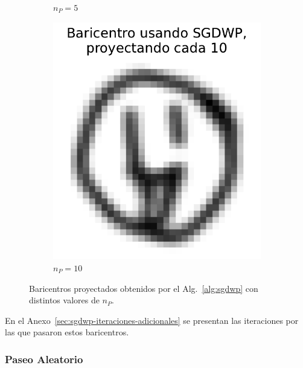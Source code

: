 \begin{figure}[htbp]
\begin{subfigure}[b]{0.23\textwidth}
        \caption{$n_P=5$}
        \label{fig:bar-SGDWP-pe-05}
    \end{subfigure}
    \hfill
    \begin{subfigure}[b]{0.23\textwidth}
        \centering
        \includegraphics[width=\textwidth]{img/sgdwp-pe/bar-SGDWP-pe-10.pdf}
        \caption{$n_P=10$}
        \label{fig:bar-SGDWP-pe-10}
    \end{subfigure}
    \caption{Baricentros proyectados obtenidos por el Alg.~\ref{alg:sgdwp} con distintos valores de $n_P$.}
    \label{fig:bar-SGDWP-pe}
\end{figure}


En el Anexo~\ref{sec:sgdwp-iteraciones-adicionales} se presentan las iteraciones por las que pasaron estos baricentros.

\subsubsection{Paseo Aleatorio}\label{sssec:sgdwp-paseo-aleatorio}  %

